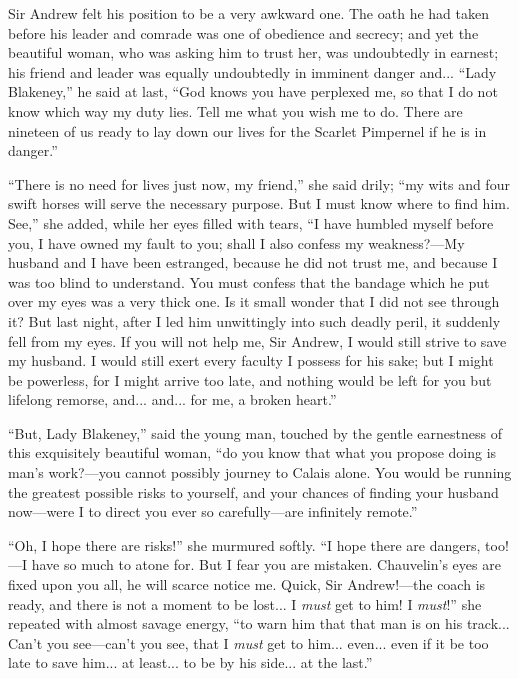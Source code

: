 \documentclass[paper=a5,BCOR=7mm,twoside,DIV=calc,12pt,usegeometry,chapterprefix,endperiod,headings=big]{scrbook}
\begin{document}
Sir Andrew felt his position to be a very awkward one. The oath he had taken before his leader and comrade was one of obedience and secrecy; and yet the beautiful woman, who was asking him to trust her, was undoubtedly in earnest; his friend and leader was equally undoubtedly in imminent danger and... \enquote{Lady Blakeney,} he said at last, \enquote{God knows you have perplexed me, so that I do not know which way my duty lies. Tell me what you wish me to do. There are nineteen of us ready to lay down our lives for the Scarlet Pimpernel if he is in danger.}

\enquote{There is no need for lives just now, my friend,} she said drily; \enquote{my wits and four swift horses will serve the necessary purpose. But I must know where to find him. See,} she added, while her eyes filled with tears, \enquote{I have humbled myself before you, I have owned my fault to you; shall I also confess my weakness?---My husband and I have been estranged, because he did not trust me, and because I was too blind to understand. You must confess that the bandage which he put over my eyes was a very thick one. Is it small wonder that I did not see through it? But last night, after I led him unwittingly into such deadly peril, it suddenly fell from my eyes. If you will not help me, Sir Andrew, I would still strive to save my husband. I would still exert every faculty I possess for his sake; but I might be powerless, for I might arrive too late, and nothing would be left for you but lifelong remorse, and... and... for me, a broken heart.}

\enquote{But, Lady Blakeney,} said the young man, touched by the gentle earnestness of this exquisitely beautiful woman, \enquote{do you know that what you propose doing is man's work?---you cannot possibly journey to Calais alone. You would be running the greatest possible risks to yourself, and your chances of finding your husband now---were I to direct you ever so carefully---are infinitely remote.}

\enquote{Oh, I hope there are risks!} she murmured softly. \enquote{I hope there are dangers, too!---I have so much to atone for. But I fear you are mistaken. Chauvelin's eyes are fixed upon you all, he will scarce notice me. Quick, Sir Andrew!---the coach is ready, and there is not a moment to be lost... I \textit{must} get to him! I \textit{must}!} she repeated with almost savage energy, \enquote{to warn him that that man is on his track... Can't you see---can't you see, that I \textit{must} get to him... even... even if it be too late to save him... at least... to be by his side... at the last.}
\end{document}
